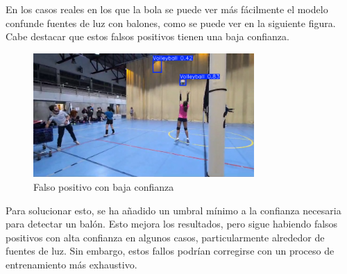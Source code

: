 \documentclass[12pt]{report} %
\begin{document}
    En los casos reales en los que la bola se puede ver más fácilmente el
    modelo confunde fuentes de luz con balones, como se
    puede ver en la siguiente figura. Cabe destacar que estos falsos positivos
    tienen una baja confianza.

    \begin{figure}[H]
    \includegraphics[width=0.75\textwidth]{bola1.png}
    \caption{Falso positivo con baja confianza}
    \end{figure}

    Para solucionar esto, se ha añadido un umbral mínimo a la confianza
    necesaria para detectar un balón. Esto mejora los resultados, pero sigue
    habiendo falsos positivos con alta confianza en algunos casos,
    particularmente alrededor de fuentes de luz. Sin embargo, estos fallos
    podrían corregirse con un proceso de entrenamiento más exhaustivo.
\end{document}

